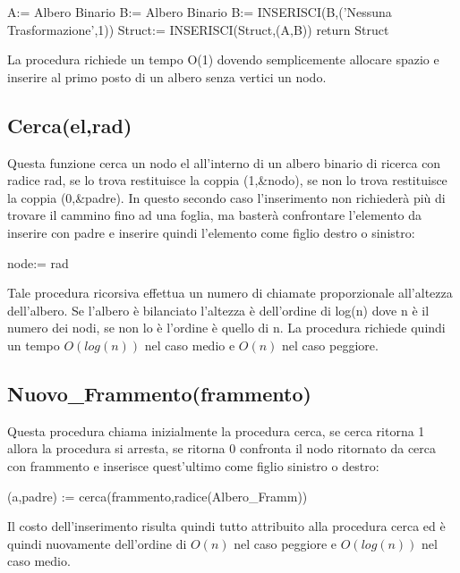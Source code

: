\documentclass[a4paper,10pt]{article}
\begin{document}
\begin{algorithm}[H]
A:= Albero Binario\;
B:= Albero Binario\;
B:= INSERISCI(B,('Nessuna Trasformazione',1))\;
Struct:= INSERISCI(Struct,(A,B))\;
return Struct\;
\end{algorithm}
La procedura richiede un tempo O(1) dovendo semplicemente allocare spazio e inserire al primo posto di un albero senza vertici un nodo.
\subsection{Cerca(el,rad)}
Questa funzione cerca un nodo el all'interno di un albero binario di ricerca con radice rad, se lo trova restituisce la coppia (1,\&{}nodo), se non lo trova restituisce la coppia (0,\&{}padre). In questo secondo caso l'inserimento non richiederà più di trovare il cammino fino ad una foglia, ma basterà confrontare l'elemento da inserire con padre e inserire quindi l'elemento come figlio destro o sinistro:

\begin{algorithm}[H]
node:= rad\;
\end{algorithm}
Tale procedura ricorsiva effettua un numero di chiamate proporzionale all'altezza dell'albero. Se l'albero è bilanciato l'altezza è dell'ordine di log(n) dove n è il numero dei nodi, se non lo è l'ordine è quello di n. La procedura richiede quindi un tempo $O(log(n))$ nel caso medio e $O(n)$ nel caso peggiore.
\subsection{Nuovo\_{}Frammento(frammento)}
Questa procedura chiama inizialmente la procedura cerca, se cerca ritorna 1 allora la procedura si arresta, se ritorna 0 confronta il nodo ritornato da cerca con frammento e inserisce quest'ultimo come figlio sinistro o destro:

\begin{algorithm}[H]
(a,padre) := cerca(frammento,radice(Albero\_{}Framm))\;
\end{algorithm}
Il costo dell'inserimento risulta quindi tutto attribuito alla procedura cerca ed è quindi nuovamente dell'ordine di $O(n)$ nel caso peggiore e $O(log(n))$ nel caso medio.
\end{document}
